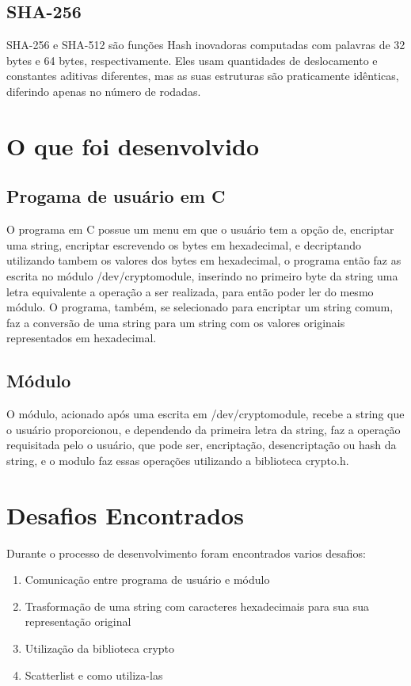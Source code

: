 \subsection{SHA-256}

SHA-256 e SHA-512 são funções Hash inovadoras computadas com palavras de 32 bytes e 64 bytes, respectivamente. Eles usam quantidades de deslocamento e constantes aditivas diferentes, mas as suas estruturas são praticamente idênticas, diferindo apenas no número de rodadas.


\section{O que foi desenvolvido}

\subsection{Progama de usuário em C}

O programa em C possue um menu em que o usuário tem a opção de, encriptar uma string, encriptar escrevendo os bytes em hexadecimal, e decriptando utilizando tambem os valores dos bytes em hexadecimal, o programa então faz as escrita no módulo /dev/cryptomodule, inserindo no primeiro byte da string uma letra equivalente a operação a ser realizada, para então poder ler do mesmo módulo. O programa, também, se selecionado para encriptar um string comum, faz a conversão de uma string para um string com os valores originais representados em hexadecimal.

\subsection{Módulo}

O módulo, acionado após uma escrita em /dev/cryptomodule, recebe a string que o usuário proporcionou, e dependendo da primeira letra da string, faz a operação requisitada pelo o usuário, que pode ser, encriptação, desencriptação ou hash da string, e o modulo faz essas operações utilizando a biblioteca crypto.h.

\vfill

\section{Desafios Encontrados}

Durante o processo de desenvolvimento foram encontrados varios desafios:

\begin{enumerate}
\item Comunicação entre programa de usuário e módulo
\item Trasformação de uma string com caracteres hexadecimais para sua sua representação original
\item Utilização da biblioteca crypto
\item Scatterlist e como utiliza-las
\end{enumerate}

